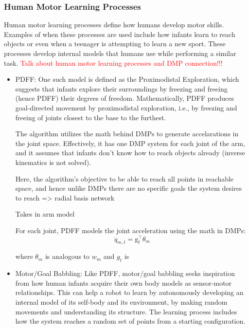 \documentclass[10pt]{article}
\begin{document}
\subsubsection{Human Motor Learning Processes}
Human motor learning processes define how humans develop motor skills. Examples of when these processes are used include how infants learn to reach objects or even when a teenager is attempting to learn a new sport. These processes develop internal models that humans use while performing a similar task. 
\textcolor{red}{Talk about human motor learning processes and DMP connection!!!}
\begin{itemize}
    \item PDFF: One such model is defined as the Proximodistal Exploration, which suggests that infants explore their surroundings by freezing and freeing (hence PDFF) their degrees of freedom. Mathematically, PDFF produces goal-directed movement by proximodistal exploration, i.e., by freezing and freeing of joints closest to the base to the furthest.
    
    The algorithm utilizes the math behind DMPs to generate accelarations in the joint space. Effectively, it has one DMP system for each joint of the arm, and it assumes that infants don't know how to reach objects already (inverse kinematics is not solved). 
    
    Here, the algorithm's objective to be able to reach all points in reachable space, and hence unlike DMPs there are no specific goals the system desires to reach => radial basis network
    
    Takes in arm model
    
    For each joint, PDFF models the joint acceleration using the math in DMPs:
    \begin{equation}
        \ddot{q}_{m,t} = \text{g}_t^\intercal\theta_m
    \end{equation}
    
    where $\theta_m$ is analogous to $w_m$ and $g_t$ is 
    
    
    
    \item Motor/Goal Babbling: Like PDFF, motor/goal babbling seeks inspiration from how human infants acquire their own body models as sensor-motor relationships. This can help a robot to learn by autonomously developing an internal model of its self-body and its environment, by making random movements and understanding its structure. The learning process includes how the system reaches a random set of points from a starting configuration. 
\end{itemize}
\end{document}
